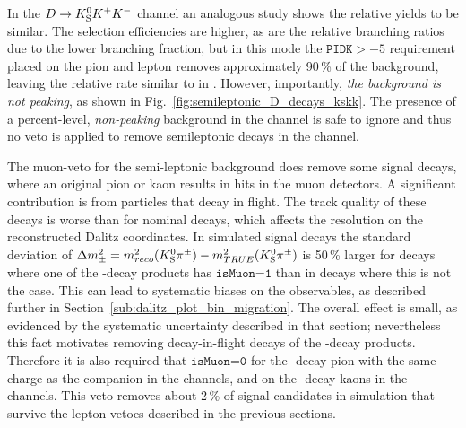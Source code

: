 
In the ${D}\rightarrow{\ensuremath{{K}^0_{\mathrm{S}}}}{\ensuremath{{K}^+}}{\ensuremath{{K}^-}}$ channel an analogous study shows the relative yields to be similar. The selection efficiencies are higher, as are the relative branching ratios due to the lower \DtoKskk branching fraction, but in this mode the $\texttt{PIDK}>-5$ requirement placed on the pion and lepton removes approximately 90\,\% of the background, leaving the relative rate similar to in \DtoKspipi. However, importantly, \emph{the background is not peaking}, as shown in Fig.~\ref{fig:semileptonic_D_decays_kskk}. The presence of a percent-level, \emph{non-peaking} background in the \DtoKskk channel is safe to ignore and thus no veto is applied to remove semileptonic \D decays in the \DtoKskk channel.



The muon-veto for the semi-leptonic background does remove some signal decays, where an original pion or kaon results in hits in the muon detectors. A significant contribution is from particles that decay in flight. The track quality of these decays is worse than for nominal decays, which affects the resolution on the reconstructed Dalitz coordinates. In simulated signal decays the standard deviation of $\Delta m^2_\pm = m^2_{reco}({{K}^0_{\mathrm{S}}}{{\pi}^\pm})-m^2_{TRUE}({{K}^0_{\mathrm{S}}}{{\pi}^\pm})$ is 50\,\% larger for decays where one of the \D-decay products has $\texttt{isMuon=1}$ than in decays where this is not the case. This can lead to systematic biases on the observables, as described further in Section~\ref{sub:dalitz_plot_bin_migration}. The overall effect is small, as evidenced by the systematic uncertainty described in that section; nevertheless this fact motivates removing decay-in-flight decays of the \D-decay products. Therefore it is also required that $\texttt{isMuon=0}$ for the \D-decay pion with the same charge as the companion in the \DtoKspipi channels, and on the \D-decay kaons in the \DtoKskk channels. This veto removes about 2\,\% of signal candidates in simulation that survive the lepton vetoes described in the previous sections.


